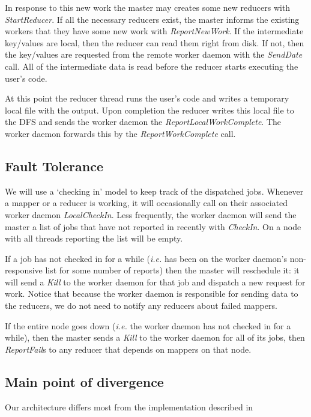 \documentclass[10pt,letter,final,article,twocolumn]{article} %
\newcommand{\rpc}[1]{\emph{#1}}
\begin{document}
In response to this new work the master may creates some new reducers with \rpc{StartReducer}. If all the necessary reducers exist, the master informs the existing workers that they have some new work with \rpc{ReportNewWork}. If the intermediate key/values  are local, then the reducer can read them right from disk. If not, then the key/values are requested from the remote worker daemon with the \rpc{SendDate} call. All of the intermediate data is read before the reducer starts executing the user's code.

At this point the reducer thread runs the user's code and writes a temporary local file with the output. Upon completion the reducer writes this local file to the DFS and sends the worker daemon the \rpc{ReportLocalWorkComplete}. The worker daemon forwards this by the \rpc{ReportWorkComplete} call.

\subsection{Fault Tolerance}
We will use a `checking in' model to keep track of the dispatched jobs. Whenever a mapper or a reducer is working, it will occasionally call on their associated worker daemon \rpc{LocalCheckIn}. Less frequently, the worker daemon will send the master a list of jobs that have not reported in recently with \rpc{CheckIn}. On a node with all threads reporting the list will be empty.

If a job has not checked in for a while (\textit{i.e.} has been on the worker daemon's non-responsive list for some number of reports) then the master will reschedule it: it will send a \rpc{Kill} to the worker daemon for that job and dispatch a new request for work. Notice that because the worker daemon is responsible for sending data to the reducers, we do not need to notify any reducers about failed mappers.

If the entire node goes down (\textit{i.e.} the worker daemon has not checked in for a while), then the master sends a \rpc{Kill} to the worker daemon for all of its jobs, then \rpc{ReportFail}s to any reducer that depends on mappers on that node.

\subsection{Main point of divergence}

Our architecture differs most from the implementation described in 

\end{document}
